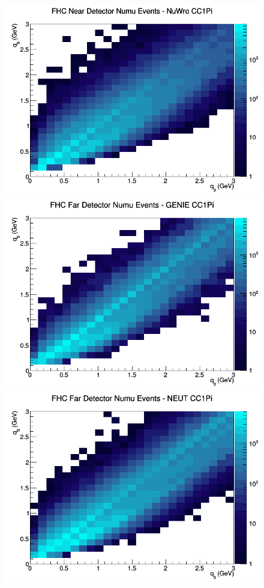 \begin{figure}[h]
\includegraphics[width=\linewidth]{eff_q0_q3/FGT/CC1Pi_FHC_ND_numu_q3_q0_NuWro.png}
\endminipage
\newline
{}
\includegraphics[width=\linewidth]{eff_q0_q3/FGT/CC1Pi_FHC_FD_numu_q3_q0_GENIE.png}
\endminipage
{}
\includegraphics[width=\linewidth]{eff_q0_q3/FGT/CC1Pi_FHC_FD_numu_q3_q0_NEUT.png}

\end{figure}
